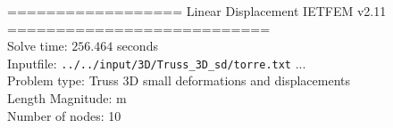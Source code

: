 \documentclass[a4paper,11pt]{article}
\begin{document}

================== Linear Displacement IETFEM v2.11 ===========================\\


Solve time: $256.464$ seconds \\

Inputfile: \verb|../../input/3D/Truss_3D_sd/torre.txt|  ... \\

Problem type: Truss 3D small deformations and displacements\\ 

Length Magnitude: m \\

Number of nodes: 10 \\

\newpage       
\end{document}
